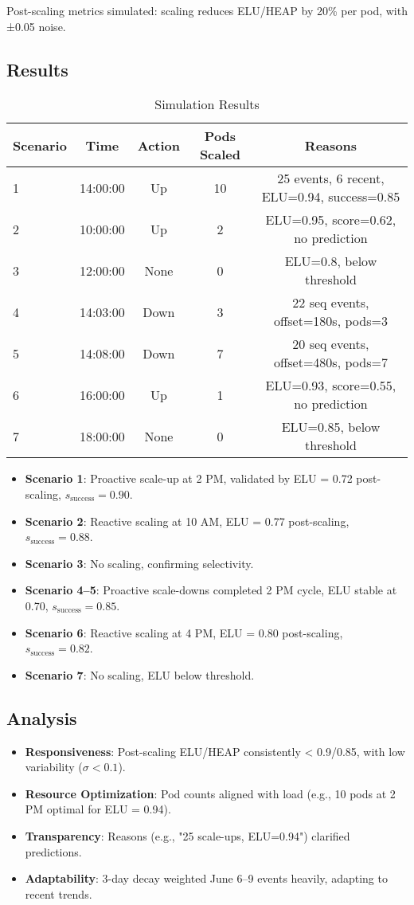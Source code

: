\documentclass[12pt]{article}
\begin{document}
Post-scaling metrics simulated: scaling reduces ELU/HEAP by 20\% per pod, with ±0.05 noise.

\subsection{Results}
\begin{table}[h]
\caption{Simulation Results}
\centering
\begin{tabular}{lcccc}
\toprule
Scenario & Time & Action & Pods Scaled & Reasons \\
\midrule
1 & 14:00:00 & Up & 10 & 25 events, 6 recent, ELU=0.94, success=0.85 \\
2 & 10:00:00 & Up & 2 & ELU=0.95, score=0.62, no prediction \\
3 & 12:00:00 & None & 0 & ELU=0.8, below threshold \\
4 & 14:03:00 & Down & 3 & 22 seq events, offset=180s, pods=3 \\
5 & 14:08:00 & Down & 7 & 20 seq events, offset=480s, pods=7 \\
6 & 16:00:00 & Up & 1 & ELU=0.93, score=0.55, no prediction \\
7 & 18:00:00 & None & 0 & ELU=0.85, below threshold \\
\bottomrule
\end{tabular}
\end{table}

\begin{itemize}
    \item \textbf{Scenario 1}: Proactive scale-up at 2 PM, validated by ELU = 0.72 post-scaling, $s_{\text{success}} = 0.90$.
    \item \textbf{Scenario 2}: Reactive scaling at 10 AM, ELU = 0.77 post-scaling, $s_{\text{success}} = 0.88$.
    \item \textbf{Scenario 3}: No scaling, confirming selectivity.
    \item \textbf{Scenario 4–5}: Proactive scale-downs completed 2 PM cycle, ELU stable at 0.70, $s_{\text{success}} = 0.85$.
    \item \textbf{Scenario 6}: Reactive scaling at 4 PM, ELU = 0.80 post-scaling, $s_{\text{success}} = 0.82$.
    \item \textbf{Scenario 7}: No scaling, ELU below threshold.
\end{itemize}

\subsection{Analysis}
\begin{itemize}
    \item \textbf{Responsiveness}: Post-scaling ELU/HEAP consistently < 0.9/0.85, with low variability ($\sigma < 0.1$).
    \item \textbf{Resource Optimization}: Pod counts aligned with load (e.g., 10 pods at 2 PM optimal for ELU = 0.94).
    \item \textbf{Transparency}: Reasons (e.g., "25 scale-ups, ELU=0.94") clarified predictions.
    \item \textbf{Adaptability}: 3-day decay weighted June 6–9 events heavily, adapting to recent trends.
\end{itemize}
\end{document}
